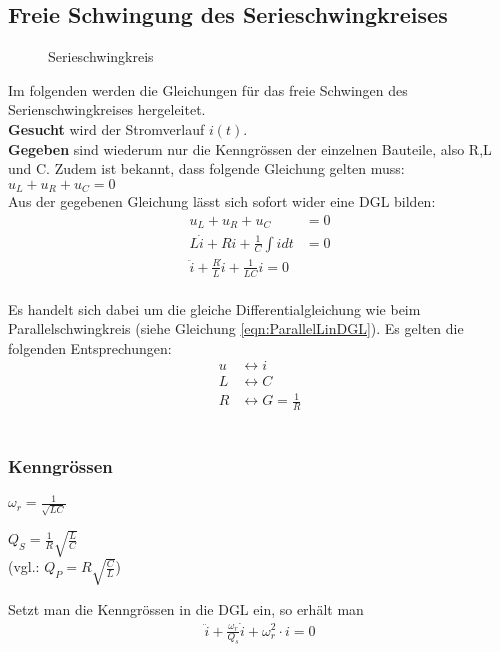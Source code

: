 \subsection{Freie Schwingung des Serieschwingkreises}

\begin{wrapfigure}{l}{0.55\textwidth}
	\centering
	
	\vspace{-0.15cm}
	\caption{Serieschwingkreis}
	\label{fig:SerieSKGeschlossen}
\end{wrapfigure}

Im folgenden werden die Gleichungen für das freie Schwingen des
Serienschwingkreises hergeleitet.\\

\textbf{Gesucht} wird der Stromverlauf
$i(t)$. \\
\textbf{Gegeben} sind wiederum nur die Kenngrössen der einzelnen Bauteile, also
R,L und C. Zudem ist bekannt, dass folgende Gleichung gelten muss: \\ $u_L +
u_R + u_C = 0$ \\


Aus der gegebenen Gleichung lässt sich sofort wider eine DGL bilden:
\begin{align}
	u_L + u_R + u_C &= 0\nonumber\\
	L\dot{i} + Ri + \frac{1}{C}\int{i}dt&=0\nonumber\\
	\boxed{\ddot{i}+\frac{R}{L}\dot{i}+\frac{1}{LC}i=0}
	\\
	\nonumber
\end{align}



Es handelt sich dabei um die gleiche Differentialgleichung wie beim
Parallelschwingkreis (siehe Gleichung \ref{eqn:ParallelLinDGL}). Es gelten die
folgenden Entsprechungen:
\begin{align}
u &\leftrightarrow i\nonumber\\
L &\leftrightarrow C\nonumber\\
R &\leftrightarrow G=\frac{1}{R}\nonumber
\end{align}\\

\subsubsection{Kenngrössen}
\begin{description}
[style=multiline,topsep=0pt,leftmargin=4.5cm,rightmargin=2cm]
  \item[Resonanzfrequenz] $\omega_r=\frac{1}{\sqrt{LC}}$ 
  \item[Güte Q] $Q_S=\frac{1}{R}\sqrt{\frac{L}{C}}$ \\
  	(vgl.: $Q_P=R\sqrt{\frac{C}{L}}$)
\end{description}


Setzt man die Kenngrössen in die DGL ein, so erhält man 
\begin{align}
\boxed{\ddot i + \frac{\omega_r}{Q_s}\dot i + \omega_r^2\cdot i = 0}
\end{align}


